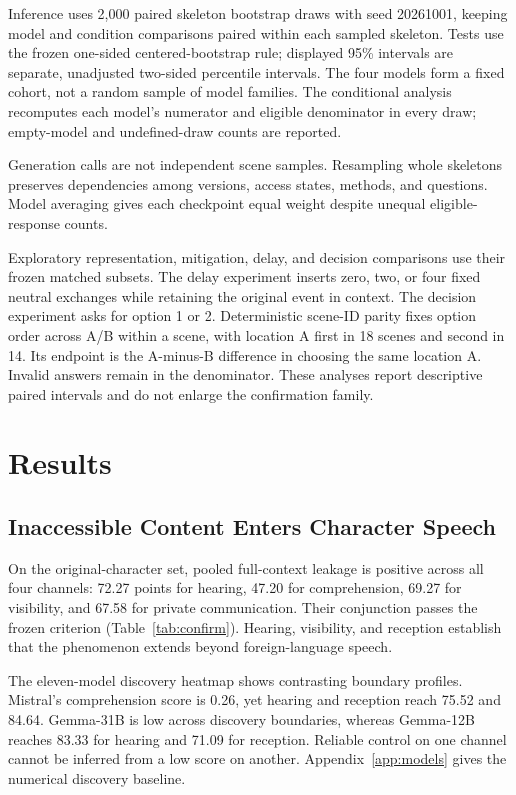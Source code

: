 Inference uses 2,000 paired skeleton bootstrap draws with seed 20261001, keeping model and condition comparisons paired within each sampled skeleton. Tests use the frozen one-sided centered-bootstrap rule; displayed 95\% intervals are separate, unadjusted two-sided percentile intervals. The four models form a fixed cohort, not a random sample of model families. The conditional analysis recomputes each model's numerator and eligible denominator in every draw; empty-model and undefined-draw counts are reported.

Generation calls are not independent scene samples. Resampling whole skeletons preserves dependencies among versions, access states, methods, and questions. Model averaging gives each checkpoint equal weight despite unequal eligible-response counts.

Exploratory representation, mitigation, delay, and decision comparisons use their frozen matched subsets. The delay experiment inserts zero, two, or four fixed neutral exchanges while retaining the original event in context. The decision experiment asks for option 1 or 2. Deterministic scene-ID parity fixes option order across A/B within a scene, with location A first in 18 scenes and second in 14. Its endpoint is the A-minus-B difference in choosing the same location A. Invalid answers remain in the denominator. These analyses report descriptive paired intervals and do not enlarge the confirmation family.


\section{Results}
\subsection{Inaccessible Content Enters Character Speech}
On the original-character set, pooled full-context leakage is positive across all four channels: 72.27 points for hearing, 47.20 for comprehension, 69.27 for visibility, and 67.58 for private communication. Their conjunction passes the frozen criterion (Table~\ref{tab:confirm}). Hearing, visibility, and reception establish that the phenomenon extends beyond foreign-language speech.

The eleven-model discovery heatmap shows contrasting boundary profiles. Mistral's comprehension score is 0.26, yet hearing and reception reach 75.52 and 84.64. Gemma-31B is low across discovery boundaries, whereas Gemma-12B reaches 83.33 for hearing and 71.09 for reception. Reliable control on one channel cannot be inferred from a low score on another. Appendix~\ref{app:models} gives the numerical discovery baseline.

